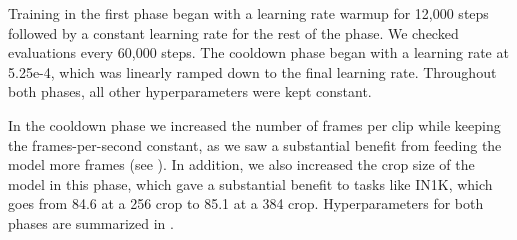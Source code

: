\documentclass[]{fairmeta}
\begin{document}
Training in the first phase began with a learning rate warmup for 12,000 steps followed by a constant learning rate for the rest of the phase.
We checked evaluations every 60,000 steps.
The cooldown phase began with a learning rate at 5.25e-4, which was linearly ramped down to the final learning rate.
Throughout both phases, all other hyperparameters were kept constant.

In the cooldown phase we increased the number of frames per clip while keeping the frames-per-second constant, as we saw a substantial benefit from feeding the model more frames (see ).
In addition, we also increased the crop size of the model in this phase, which gave a substantial benefit to tasks like IN1K, which goes from 84.6 at a 256 crop to 85.1 at a 384 crop.
Hyperparameters for both phases are summarized in .
\end{document}
